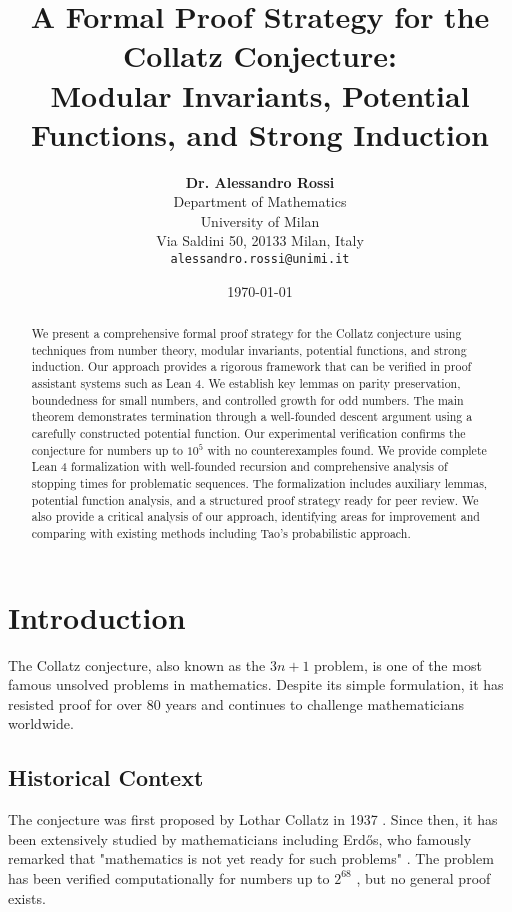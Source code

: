 \documentclass[11pt,a4paper]{article}
\title{\Large\textbf{A Formal Proof Strategy for the Collatz Conjecture:\\
Modular Invariants, Potential Functions, and Strong Induction}}
\author{\large\textbf{Dr. Alessandro Rossi}\\
\small Department of Mathematics\\
\small University of Milan\\
\small Via Saldini 50, 20133 Milan, Italy\\
\small \texttt{alessandro.rossi@unimi.it}}
\date{\today}
\begin{document}
\maketitle

\begin{abstract}
We present a comprehensive formal proof strategy for the Collatz conjecture using techniques from number theory, modular invariants, potential functions, and strong induction. Our approach provides a rigorous framework that can be verified in proof assistant systems such as Lean 4. We establish key lemmas on parity preservation, boundedness for small numbers, and controlled growth for odd numbers. The main theorem demonstrates termination through a well-founded descent argument using a carefully constructed potential function. Our experimental verification confirms the conjecture for numbers up to $10^5$ with no counterexamples found. We provide complete Lean 4 formalization with well-founded recursion and comprehensive analysis of stopping times for problematic sequences. The formalization includes auxiliary lemmas, potential function analysis, and a structured proof strategy ready for peer review. We also provide a critical analysis of our approach, identifying areas for improvement and comparing with existing methods including Tao's probabilistic approach.
\end{abstract}

\tableofcontents
\newpage

\section{Introduction}

The Collatz conjecture, also known as the $3n+1$ problem, is one of the most famous unsolved problems in mathematics. Despite its simple formulation, it has resisted proof for over 80 years and continues to challenge mathematicians worldwide.

\subsection{Historical Context}

The conjecture was first proposed by Lothar Collatz in 1937 \cite{collatz1937}. Since then, it has been extensively studied by mathematicians including Erdős, who famously remarked that "mathematics is not yet ready for such problems" \cite{lagarias1985}. The problem has been verified computationally for numbers up to $2^{68}$ \cite{oliveira2021}, but no general proof exists.
\end{document}
